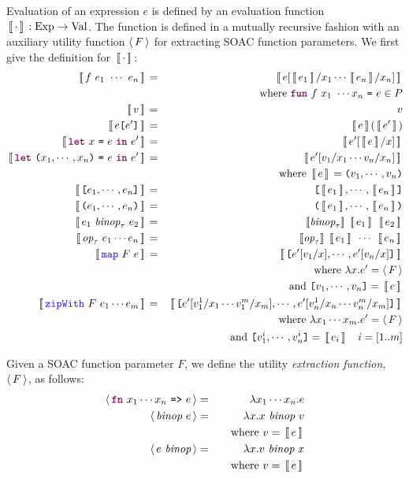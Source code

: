 \documentclass[oneside,11pt]{book}
\begin{document}
Evaluation of an expression $e$ is defined by an evaluation function
$\,[\![\,\cdot\,]\!]\, : \mathrm{Exp} \rightarrow \mathrm{Val}$. The function
is defined in a mutually recursive fashion with an auxiliary utility
function $\langle\,F\,\rangle$ for extracting SOAC function parameters. We
first give the definition for $\,[\![\,\cdot\,]\!]\,$:
\begin{eqnarray*}
  \Eval{f~e_1~\cdots~e_n} & = & \Eval{e[\Eval{e_1}/x_1\cdots \Eval{e_n}/x_n]} \\ & & ~~~ \mathrm{where}~\fw{fun}~f~x_1~ \cdots x_n ~\kw{=}~ e \in P \\
  \Eval{v} & = & v \\
  \Eval{e\kw{[}e'\kw{]}} & = & \Eval{e}(\Eval{e'}) \\
  \Eval{\fw{let}~x~\kw{=}~e~\fw{in}~e'} & = & \Eval{e'[\Eval{e}/x]} \\
  \Eval{\fw{let}~\kw{(}x_1,\cdots,x_n\kw{)}~\kw{=}~e~\fw{in}~e'} & = & \Eval{e'[v_1/x_1\cdots v_n/x_n]} \\ & & ~~~ \mathrm{where}~ \Eval{e} = \kw{(}v_1,\cdots,v_n\kw{)} \\
  \Eval{\kw{[}e_1,\cdots,e_n\kw{]}} & = & \kw{[}\Eval{e_1},\cdots,\Eval{e_n}\kw{]} \\
  \Eval{\kw{(}e_1,\cdots,e_n\kw{)}} & = & \kw{(}\Eval{e_1},\cdots,\Eval{e_n}\kw{)} \\
  \Eval{e_1~\id{binop}_\tau~e_2} & = & \sem{\id{binop}_\tau}~\Eval{e_1}~\Eval{e_2} \\
  \Eval{\id{op}_\tau~e_1\cdots e_n} & = & \sem{\id{op}_\tau}~\Eval{e_1}~\cdots~\Eval{e_n} \\
  \Eval{\fop{map}~F~e} & = & \Eval{\kw{[}e'[v_1/x],\cdots,e'[v_n/x]\kw{]}} \\
    & & ~~~\mathrm{where}~\lambda x . e' = \extractF{F} \\
    & & ~~~~~\mathrm{and}~ \kw{[}v_1,\cdots,v_n\kw{]} = \Eval{e} \\
  \Eval{\fop{zipWith}~F~e_1\cdots e_m} & = & \Eval{\kw{[}e'[v_1^1/x_1\cdots v_1^m/x_m],\cdots,e'[v_n^1/x_n\cdots v_n^m/x_m]\kw{]}} \\
    & & ~~~\mathrm{where}~\lambda x_1\cdots x_m . e' = \extractF{F} \\
    & & ~~~~~\mathrm{and}~ \kw{[}v_1^i,\cdots,v_n^i\kw{]} = \Eval{e_i} ~~~ i=[1..m]
\end{eqnarray*}

Given a SOAC function parameter $F$, we define the utility \emph{extraction function}, $\langle\,F\,\rangle$, as follows:
\begin{eqnarray*}
  \extractF{\fw{fn}~x_1\cdots x_n~\kw{=>}~ e} & = & \lambda x_1 \cdots x_n . e \\
  \extractF{\id{binop}~e} & = & \lambda x . x~\id{binop}~v \\
    & & ~~~\mathrm{where}~v = \Eval{e} \\
  \extractF{e~\id{binop}} & = & \lambda x . v~\id{binop}~x \\
    & & ~~~\mathrm{where}~v = \Eval{e}
\end{eqnarray*}
\end{document}
